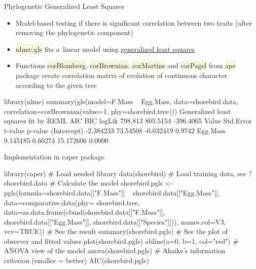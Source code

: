 \documentclass[compress, ucs, xelatex, 11pt, xcolor=svgnames, aspectratio=169,
	hyperref={
		bookmarks=true,
		unicode=true,
		colorlinks=true,
		pdftitle={Molecular data in R},
		plainpages=false,
		pdfauthor={Vojtech Zeisek},
		pdfsubject={Course about phylogeny and evolution in R},
		pdfcreator={XeLaTeX},
		pdfkeywords={R, evolution, phylogeny, molecular data},
		linkcolor=Crimson, %
		anchorcolor=Magenta, %
		citecolor=Magenta, %
		filecolor=Magenta, %
		menucolor=Magenta, %
		urlcolor=DodgerBlue, %
		pdftex},
	url={hyphens, lowtilde} %
	]{beamer}
\renewcommand{\texttt}[1]{\colorbox{Beige}{{\ttfamily #1}}}
\begin{document}
\begin{frame}[fragile]{Phylogenetic Generalized Least Squares}
	\begin{itemize}
		\item Model-based testing if there is significant correlation between two traits (after removing the phylogenetic component)
		\item \texttt{nlme::gls} fits a~linear model using \href{https://en.wikipedia.org/wiki/Generalized_least_squares}{generalized least squares}
		\item Functions \texttt{corBlomberg}, \texttt{corBrownian}, \texttt{corMartins} and \texttt{corPagel} from \texttt{ape} package create correlation matrix of evolution of continuous character according to the given tree
	\end{itemize}
	\begin{spluscode}
    library(nlme)
    summary(gls(model=F.Mass ~ Egg.Mass, data=shorebird.data,
      correlation=corBrownian(value=1, phy=shorebird.tree)))
      Generalized least squares fit by REML
          AIC      BIC    logLik
      798.813 805.5154 -396.4065
                    Value Std.Error   t-value p-value
    (Intercept) -2.384233  73.54508 -0.032419  0.9742
    Egg.Mass     9.145185   0.60274 15.172606  0.0000
\end{spluscode}
\end{frame}

\begin{frame}[fragile]{Implementation in caper package}
	\begin{spluscode}
    library(caper) # Load needed library
    data(shorebird) # Load training data, see ?shorebird.data
    # Calculate the model
    shorebird.pgls <- pgls(formula=shorebird.data[["F.Mass"]] ~
      shorebird.data[["Egg.Mass"]], data=comparative.data(phy=
      shorebird.tree, data=as.data.frame(cbind(shorebird.data[["F.Mass"]],
      shorebird.data[["Egg.Mass"]], shorebird.data[["Species"]])),
      names.col=V3, vcv=TRUE))
    # See the result
    summary(shorebird.pgls)
    # See the plot of observer and fitted values
    plot(shorebird.pgls)
    abline(a=0, b=1, col="red")
    # ANOVA view of the model
    anova(shorebird.pgls)
    # Akaike's information criterion (smaller = better)
    AIC(shorebird.pgls)
	\end{spluscode}
\end{frame}
\end{document}
